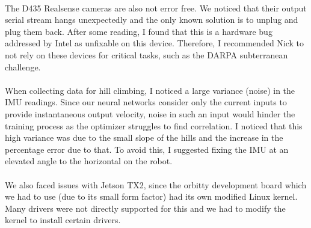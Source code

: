 \paragraph{}
The D435 Realsense cameras are also not error free. We noticed that their output serial stream hangs unexpectedly and the only known solution is to unplug and plug them back. After some reading, I found that this is a hardware bug addressed by Intel as unfixable on this device. Therefore, I recommended Nick to not rely on these devices for critical tasks, such as the DARPA subterranean challenge.

\paragraph{}
When collecting data for hill climbing, I noticed a large variance (noise) in the IMU readings. Since our neural networks consider only the current inputs to provide instantaneous output velocity, noise in such an input would hinder the training process as the optimizer struggles to find correlation. I noticed that this high variance was due to the small slope of the hills and the increase in the percentage error due to that. To avoid this, I suggested fixing the IMU at an elevated angle to the horizontal on the robot.

\paragraph{}
We also faced issues with Jetson TX2, since the orbitty development board which we had to use (due to its small form factor) had its own modified Linux kernel. Many drivers were not directly supported for this and we had to modify the kernel to install certain drivers.
